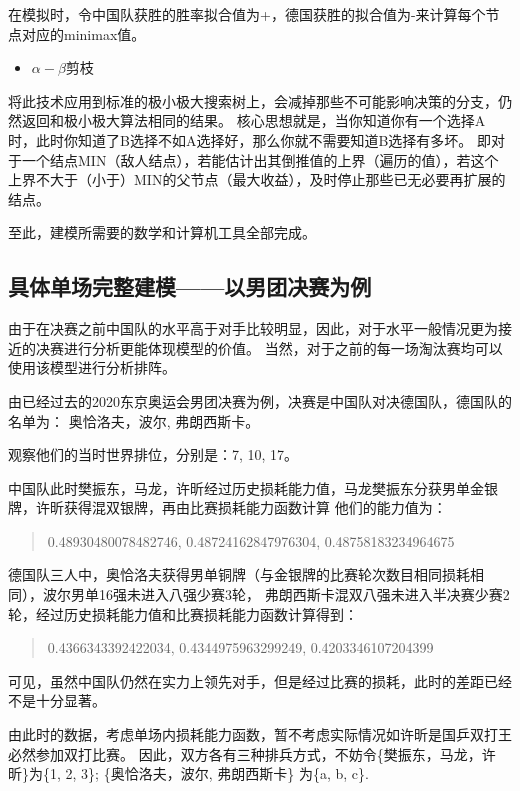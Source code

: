 \documentclass[a4paper,AutoFakeBold,AutoFakeSlant]{ctexart}
\begin{document}
在模拟时，令中国队获胜的胜率拟合值为+，德国获胜的拟合值为-来计算每个节点对应的minimax值。

\begin{itemize}
  \item $\alpha-\beta$剪枝
\end{itemize}

将此技术应用到标准的极小极大搜索树上，会减掉那些不可能影响决策的分支，仍然返回和极小极大算法相同的结果。\cite{aimethod}
核心思想就是，当你知道你有一个选择A时，此时你知道了B选择不如A选择好，那么你就不需要知道B选择有多坏。
即对于一个结点MIN（敌人结点），若能估计出其倒推值的上界（遍历的值），若这个上界不大于（小于）MIN的父节点（最大收益），及时停止那些已无必要再扩展的结点。

至此，建模所需要的数学和计算机工具全部完成。

\subsection{具体单场完整建模——以男团决赛为例}
由于在决赛之前中国队的水平高于对手比较明显，因此，对于水平一般情况更为接近的决赛进行分析更能体现模型的价值。
当然，对于之前的每一场淘汰赛均可以使用该模型进行分析排阵。

由已经过去的2020东京奥运会男团决赛为例，决赛是中国队对决德国队，德国队的名单为：
奥恰洛夫，波尔, 弗朗西斯卡。

观察他们的当时世界排位，分别是：7, 10, 17。

中国队此时樊振东，马龙，许昕经过历史损耗能力值，马龙樊振东分获男单金银牌，许昕获得混双银牌，再由比赛损耗能力函数计算
他们的能力值为：
\begin{quote}
  0.48930480078482746, 0.48724162847976304, 0.48758183234964675
\end{quote}

德国队三人中，奥恰洛夫获得男单铜牌（与金银牌的比赛轮次数目相同损耗相同），波尔男单16强未进入八强少赛3轮，
弗朗西斯卡混双八强未进入半决赛少赛2轮，经过历史损耗能力值和比赛损耗能力函数计算得到：
\begin{quote}
  0.4366343392422034, 0.4344975963299249, 0.4203346107204399
\end{quote}

可见，虽然中国队仍然在实力上领先对手，但是经过比赛的损耗，此时的差距已经不是十分显著。

由此时的数据，考虑单场内损耗能力函数，暂不考虑实际情况如许昕是国乒双打王必然参加双打比赛。
因此，双方各有三种排兵方式，不妨令\{樊振东，马龙，许昕\}为\{1, 2, 3\}; \{奥恰洛夫，波尔, 弗朗西斯卡\}
为\{a, b, c\}.
\end{document}
